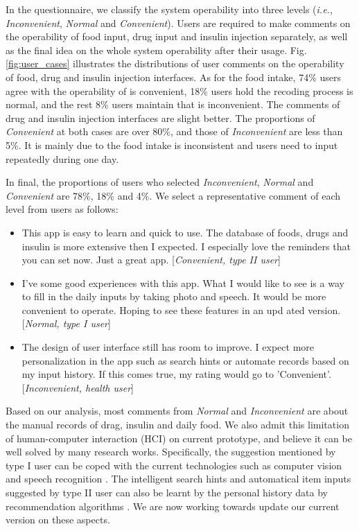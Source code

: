 {%

In the questionnaire, we classify the system operability into three levels (\emph{i.e.}, \emph{Inconvenient}, \emph{Normal} and \emph{Convenient}).
Users are required to make comments on the operability of food input, drug input and insulin injection separately, as well as the final idea
on the whole system operability after their usage.
Fig.\ref{fig:user_cases} illustrates the  distributions of user comments on the operability of food, drug and insulin injection interfaces.
As for the food intake, 74\% users agree with the operability of \sysname is convenient, 18\% users hold the recoding process is normal, and the rest 8\% users maintain that \sysname is inconvenient. The comments of drug and insulin injection interfaces are slight better. The proportions of \emph{Convenient} at both cases are over 80\%, and those of \emph{Inconvenient} are less than 5\%. It is mainly due to the food intake is inconsistent and users need to input repeatedly during one day.

In final, the proportions of users who selected \emph{Inconvenient}, \emph{Normal} and \emph{Convenient} are 78\%, 18\% and 4\%. We select a representative comment of each level from users as follows:
\begin{itemize}
  \item  This app is easy to learn and quick to use. The database of foods, drugs and insulin is more extensive then I expected. I especially love the reminders that you can set now. Just a great app. [\emph{Convenient, type II user}]
  \item  I've some good experiences with this app. What I would like to see is a way to fill in the daily inputs by taking photo and speech. It would be more convenient to operate. Hoping to see these features in an upd
      ated version. [\emph{Normal, type I user}]
  \item The design of user interface still has room to improve. I expect more personalization in the app such as search hints or automate records based on my input history. If this comes true, my rating would go to 'Convenient'. [\emph{Inconvenient, health user}]
\end{itemize}

Based on our analysis, most comments from \emph{Normal} and \emph{Inconvenient} are about the manual records of drag, insulin and daily food. We also admit this limitation of human-computer interaction (HCI) on current prototype, and believe it can be well solved by many research works. Specifically, the suggestion mentioned by type I user can be coped with the current technologies such as computer vision \cite{bib:kawano2015foodcam} and speech recognition \cite{bib:hinton2012deep}.
The intelligent search hints and automatical item inputs suggested by type II user can also be learnt by the personal history data by recommendation algorithms \cite{bib:fu2000mining, bib:sarwar2001item}.
We are now working towards update our current version on these aspects.


}
